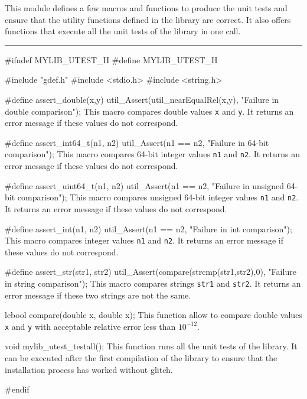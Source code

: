 
This module defines a few macros and functions to produce the unit tests and ensure that the utility functions defined in the library are correct. It also offers functions that execute all the unit tests of the library in one call.

\bigskip
\hrule
\code
\hide
#ifndef MYLIB_UTEST_H
#define MYLIB_UTEST_H
\endhide

#include "gdef.h"
#include <stdio.h>
#include <string.h>

#define assert_double(x,y) util_Assert(util\_nearEqualRel(x,y), "Failure in double comparison");
\endcode
 \tab  This macro compares double values {\tt x} and {\tt y}. 
  It returns an error message if these values do not correspond.
 \endtab
\code

#define assert_int64_t(n1, n2) util_Assert(n1 == n2, "Failure in 64-bit comparison");
\endcode
 \tab  This macro compares 64-bit integer values {\tt n1} and {\tt n2}. 
  It returns an error message if these values do not correspond.
 \endtab
\code

#define assert_uint64_t(n1, n2) util_Assert(n1 == n2, "Failure in unsigned 64-bit comparison");
\endcode
 \tab  This macro compares unsigned 64-bit integer values {\tt n1} and {\tt n2}. 
  It returns an error message if these values do not correspond.
 \endtab
\code

#define assert_int(n1, n2) util_Assert(n1 == n2, "Failure in int comparison");
\endcode
 \tab  This macro compares integer values {\tt n1} and {\tt n2}. 
  It returns an error message if these values do not correspond.
 \endtab
\code

#define assert_str(str1, str2) util_Assert(compare(strcmp(str1,str2),0), "Failure in string comparison");
\endcode
 \tab  This macro compares strings {\tt str1} and {\tt str2}. 
  It returns an error message if these two strings are not the same.
 \endtab
\code

lebool compare(double x, double x);
\endcode
 \tab  This function allow to compare double values {\tt x} and {\tt y} with acceptable 
   relative error less than $10^{-12}$.
 \endtab
\code

void mylib_utest_testall();
\endcode
 \tab  This function runs all the unit tests of the library. It can be executed after the first compilation of the library to ensure that the installation process has worked without glitch.
 \endtab
\code

\hide
#endif
\endhide
\endcode
